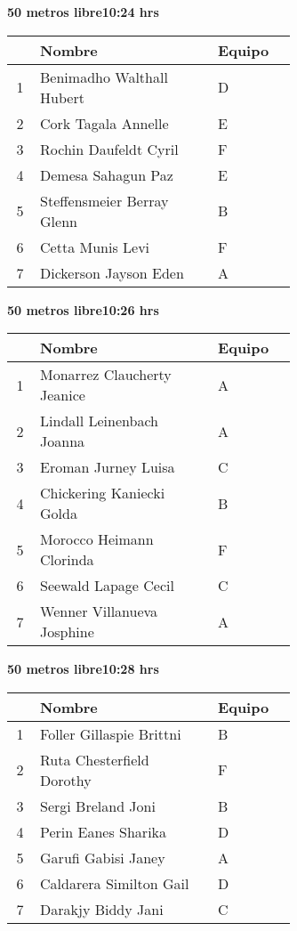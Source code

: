 \begin{minipage}{0.95\linewidth}
\begin{center}
\textbf{
50 metros libre\hspace{1cm}10:24 hrs}
\end{center}
\begin{tabular}{cp{0.63\linewidth}l}
\hline
& \textbf{Nombre} & \textbf{Equipo} \\ \hline
1 & Benimadho Walthall Hubert & D \\ 
2 & Cork Tagala Annelle & E \\ 
3 & Rochin Daufeldt Cyril & F \\ 
4 & Demesa Sahagun Paz & E \\ 
5 & Steffensmeier Berray Glenn & B \\ 
6 & Cetta Munis Levi & F \\ 
7 & Dickerson Jayson Eden & A \\ 
\end{tabular}
\end{minipage}
\begin{minipage}{0.95\linewidth}
\begin{center}
\textbf{
50 metros libre\hspace{1cm}10:26 hrs}
\end{center}
\begin{tabular}{cp{0.63\linewidth}l}
\hline
& \textbf{Nombre} & \textbf{Equipo} \\ \hline
1 & Monarrez Claucherty Jeanice & A \\ 
2 & Lindall Leinenbach Joanna & A \\ 
3 & Eroman Jurney Luisa & C \\ 
4 & Chickering Kaniecki Golda & B \\ 
5 & Morocco Heimann Clorinda & F \\ 
6 & Seewald Lapage Cecil & C \\ 
7 & Wenner Villanueva Josphine & A \\ 
\end{tabular}
\end{minipage}
\begin{minipage}{0.95\linewidth}
\begin{center}
\textbf{
50 metros libre\hspace{1cm}10:28 hrs}
\end{center}
\begin{tabular}{cp{0.63\linewidth}l}
\hline
& \textbf{Nombre} & \textbf{Equipo} \\ \hline
1 & Foller Gillaspie Brittni & B \\ 
2 & Ruta Chesterfield Dorothy & F \\ 
3 & Sergi Breland Joni & B \\ 
4 & Perin Eanes Sharika & D \\ 
5 & Garufi Gabisi Janey & A \\ 
6 & Caldarera Similton Gail & D \\ 
7 & Darakjy Biddy Jani & C \\ 
\end{tabular}
\end{minipage}
